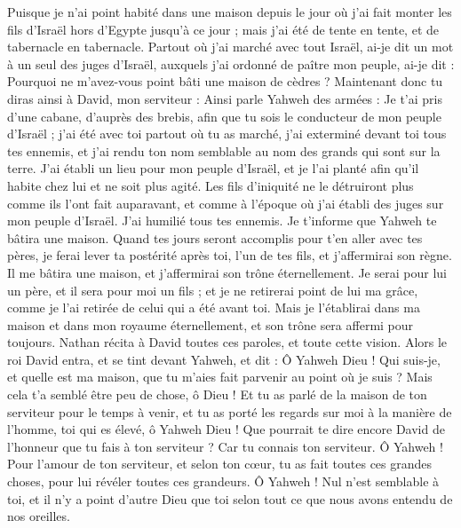 \begin{multicols}{2}
Puisque je n'ai point habité dans une maison depuis le jour où j'ai fait monter les fils d’Israël hors d'Egypte jusqu'à ce jour ; mais j'ai été de tente en tente, et de tabernacle en tabernacle.
Partout où j’ai marché avec tout Israël, ai-je dit un mot à un seul des juges d'Israël, auxquels j'ai ordonné de paître mon peuple, ai-je dit : Pourquoi ne m'avez-vous point bâti une maison de cèdres ?
Maintenant donc tu diras ainsi à David, mon serviteur : Ainsi parle Yahweh des armées : Je t'ai pris d'une cabane, d'auprès des brebis, afin que tu sois le conducteur de mon peuple d'Israël ;
j'ai été avec toi partout où tu as marché, j'ai exterminé devant toi tous tes ennemis, et j’ai rendu ton nom semblable au nom des grands qui sont sur la terre.
J’ai établi un lieu pour mon peuple d'Israël, et je l’ai planté afin qu’il habite chez lui et ne soit plus agité.  Les fils d'iniquité ne le détruiront plus comme ils l’ont fait auparavant,
et comme à l’époque où j'ai établi des juges sur mon peuple d'Israël. J’ai humilié tous tes ennemis. Je t’informe que Yahweh te bâtira une maison.
Quand tes jours seront accomplis pour t'en aller avec tes pères, je ferai lever ta postérité après toi, l’un de tes fils, et j'affermirai son règne.
Il me bâtira une maison, et j'affermirai son trône éternellement.
Je serai pour lui un père, et il sera pour moi un fils ; et je ne retirerai point de lui ma grâce, comme je l'ai retirée de celui qui a été avant toi.
Mais je l'établirai dans ma maison et dans mon royaume éternellement, et son trône sera affermi pour toujours.
Nathan récita à David toutes ces paroles, et toute cette vision.
Alors le roi David entra, et se tint devant Yahweh, et dit : Ô Yahweh Dieu ! Qui suis-je, et quelle est ma maison, que tu m'aies fait parvenir au point où je suis ?
Mais cela t'a semblé être peu de chose, ô Dieu ! Et tu as parlé de la maison de ton serviteur pour le temps à venir, et tu as porté les regards sur moi à la manière de l'homme, toi qui es élevé, ô Yahweh Dieu !
Que pourrait te dire encore David de l'honneur que tu fais à ton serviteur ? Car tu connais ton serviteur.
Ô Yahweh ! Pour l'amour de ton serviteur, et selon ton cœur, tu as fait toutes ces grandes choses, pour lui révéler toutes ces grandeurs.
Ô Yahweh ! Nul n’est semblable à toi, et il n'y a point d'autre Dieu que toi selon tout ce que nous avons entendu de nos oreilles.

\end{multicols}
